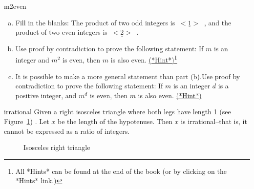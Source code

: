 \begin{exercise}{m2even}
\begin{enumerate}[(a)]
\item
Fill in the blanks:  The product of two odd integers is $\underline{~<1>~}$ , and the product of two even integers is $\underline{~<2>~}$ .
\item
Use proof by contradiction to prove the following statement: If $m$ is an integer and $m^2$ is even, then $m$ is also even.
\hyperref[sec:complex:hints]{(*Hint*)}\footnote{All *Hints* can be found at the end of the book (or by clicking on the *Hints* link.)}
\item 
It is possible to make a more general statement than part (b).Use proof by contradiction to prove the following statement: If $m$ is an integer $d$ is a positive integer, and $m^d$ is even, then $m$ is also even. 
\hyperref[sec:complex:hints]{(*Hint*)}
\end{enumerate}
\end{exercise}

\begin{prop}{irrational}
Given a right isosceles triangle where both legs have length 1 (see Figure~\ref{fig:complex:isosceles_right}) .  Let $x$ be the length of the hypotenuse.  Then $x$ is irrational--that is, it cannot be expressed as a ratio of integers. 
\end{prop}
\begin{figure}[htb]
	  \caption{\label{fig:complex:isosceles_right} Isosceles right triangle }
\end{figure}

